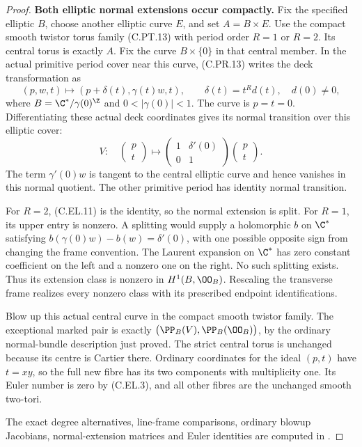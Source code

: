 \begin{proof}
\par\medskip\noindent\textbf{Both elliptic normal extensions occur compactly.}
Fix the specified elliptic $B$, choose another elliptic curve
$E$, and set $A=B\times E$. Use the compact smooth twistor
torus family (C.PT.13) with period order $R=1$ or $R=2$.
Its central torus is exactly $A$. Fix the curve $B\times\{0\}$
in that central member. In the actual primitive period cover
near this curve, (C.PR.13) writes the deck transformation as
\[
 (p,w,t)\longmapsto
       (p+\delta(t),\gamma(t)w,t),\qquad
 \delta(t)=t^R d(t),\quad d(0)\ne0,
                                                        \tag{C.EL.10}
\]
where $B=\C^*/\gamma(0)^\Z$ and $0<|\gamma(0)|<1$.
The curve is $p=t=0$. Differentiating these actual deck
coordinates gives its normal transition over this elliptic
cover:
\[
 V:\quad
 \begin{pmatrix}p\\t\end{pmatrix}\longmapsto
 \begin{pmatrix}1&\delta'(0)\\0&1\end{pmatrix}
 \begin{pmatrix}p\\t\end{pmatrix}.
                                                        \tag{C.EL.11}
\]
The term $\gamma'(0)w$ is tangent to the central elliptic
curve and hence vanishes in this normal quotient. The other
primitive period has identity normal transition.

For $R=2$, (C.EL.11) is the identity, so the normal extension
is split. For $R=1$, its upper entry is nonzero. A splitting
would supply a holomorphic $b$ on $\C^*$ satisfying
$b(\gamma(0)w)-b(w)=\delta'(0)$, with one possible opposite
sign from changing the frame convention. The Laurent
expansion on $\C^*$ has zero constant coefficient on the
left and a nonzero one on the right. No such splitting
exists. Thus its extension class is nonzero in $H^1(B,\OO_B)$.
Rescaling the transverse frame realizes every nonzero class
with its prescribed endpoint identifications.

Blow up this actual central curve in the compact smooth
twistor family. The exceptional marked pair is exactly
$\bigl(\PP_B(V),\PP_B(\OO_B)\bigr)$, by the ordinary
normal-bundle description just proved. The strict central
torus is unchanged because its centre is Cartier there.
Ordinary coordinates for the ideal $(p,t)$ have $t=xy$,
so the full new fibre has its two components with
multiplicity one. Its Euler number is zero by (C.EL.3),
and all other fibres are the unchanged smooth two-tori.

The exact degree alternatives, line-frame comparisons,
ordinary blowup Jacobians, normal-extension matrices and
Euler identities are computed in
.
\end{proof}
